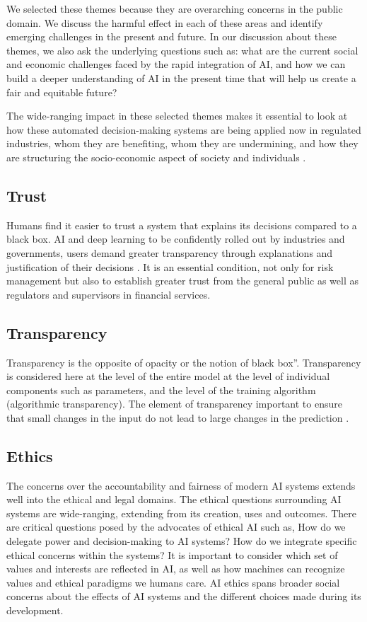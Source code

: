 We selected these themes because they are overarching concerns in the public domain. We discuss the harmful effect in each of these areas and identify emerging challenges in the present and future. In our discussion about these themes, we also ask the underlying questions such as: what are the current social and economic challenges faced by the rapid integration of AI, and how we can build a deeper understanding of AI \cite{Solon2017} in the present time that will help us create a fair and equitable future?

The wide-ranging impact in these selected themes makes it essential to look at how these automated decision-making systems are being applied now in regulated industries, whom they are benefiting, whom they are undermining, and how they are structuring the socio-economic aspect of society and individuals \cite{ainow2016report}.

\subsection{Trust}

Humans find it easier to trust a system that explains its decisions compared to a black box. AI and deep learning to be confidently rolled out by industries and governments, users demand greater transparency through explanations and justification of their decisions \cite{molnar}. It is an essential condition, not only for risk management but also to establish greater trust from the general public as well as regulators and supervisors in financial services.


\subsection{Transparency}

Transparency is the opposite of opacity or the notion of black box”. Transparency is considered here at the level of the entire model at the level of individual components such as parameters, and the level of the training algorithm (algorithmic transparency). The element of transparency important to ensure that small changes in the input do not lead to large changes in the prediction \cite{molnar}.

\subsection{Ethics}

The concerns over the accountability and fairness of modern AI systems extends well into the ethical and legal domains. The ethical questions surrounding AI systems are wide-ranging, extending from its creation, uses and outcomes. There are critical questions posed by the advocates of ethical AI such as, How do we delegate power and decision-making to AI systems? \cite{ainow2016report} How do we integrate specific ethical concerns within the systems? It is important to consider which set of values and interests are reflected in AI, as well as how machines can recognize values and ethical paradigms we humans care. AI ethics spans broader social concerns about the effects of AI systems and the different choices made during its development.

